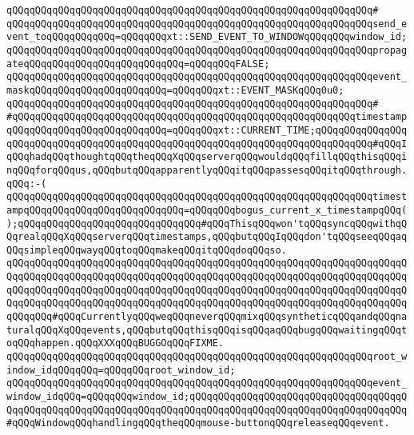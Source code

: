 \verb|qQQqqQQqqQQqqQQqqQQqqQQqqQQqqQQqqQQqqQQqqQQqqQQqqQQqqQQqqQQqqQQq#|\newline
\verb|qQQqqQQqqQQqqQQqqQQqqQQqqQQqqQQqqQQqqQQqqQQqqQQqqQQqqQQqqQQqqQQqsend_event_toqQQqqQQqqQQq=qQQqqQQqxt::SEND_EVENT_TO_WINDOWqQQqqQQqwindow_id;|\newline
\verb|qQQqqQQqqQQqqQQqqQQqqQQqqQQqqQQqqQQqqQQqqQQqqQQqqQQqqQQqqQQqqQQqpropagateqQQqqQQqqQQqqQQqqQQqqQQqqQQq=qQQqqQQqFALSE;|\newline
\verb|qQQqqQQqqQQqqQQqqQQqqQQqqQQqqQQqqQQqqQQqqQQqqQQqqQQqqQQqqQQqqQQqevent_maskqQQqqQQqqQQqqQQqqQQqqQQq=qQQqqQQqxt::EVENT_MASKqQQq0u0;|\newline
\verb|qQQqqQQqqQQqqQQqqQQqqQQqqQQqqQQqqQQqqQQqqQQqqQQqqQQqqQQqqQQqqQQq#|\newline
\verb|#qQQqqQQqqQQqqQQqqQQqqQQqqQQqqQQqqQQqqQQqqQQqqQQqqQQqqQQqqQQqtimestampqQQqqQQqqQQqqQQqqQQqqQQqqQQq=qQQqqQQqxt::CURRENT_TIME;qQQqqQQqqQQqqQQqqQQqqQQqqQQqqQQqqQQqqQQqqQQqqQQqqQQqqQQqqQQqqQQqqQQqqQQqqQQqqQQq#qQQqIqQQqhadqQQqthoughtqQQqtheqQQqXqQQqserverqQQqwouldqQQqfillqQQqthisqQQqinqQQqforqQQqus,qQQqbutqQQqapparentlyqQQqitqQQqpassesqQQqitqQQqthrough.qQQq:-(|\newline
\verb|qQQqqQQqqQQqqQQqqQQqqQQqqQQqqQQqqQQqqQQqqQQqqQQqqQQqqQQqqQQqqQQqtimestampqQQqqQQqqQQqqQQqqQQqqQQqqQQq=qQQqqQQqbogus_current_x_timestampqQQq();qQQqqQQqqQQqqQQqqQQqqQQqqQQqqQQq#qQQqThisqQQqwon'tqQQqsyncqQQqwithqQQqrealqQQqXqQQqserverqQQqtimestamps,qQQqbutqQQqIqQQqdon'tqQQqseeqQQqaqQQqsimpleqQQqwayqQQqtoqQQqmakeqQQqitqQQqdoqQQqso.|\newline
\verb|qQQqqQQqqQQqqQQqqQQqqQQqqQQqqQQqqQQqqQQqqQQqqQQqqQQqqQQqqQQqqQQqqQQqqQQqqQQqqQQqqQQqqQQqqQQqqQQqqQQqqQQqqQQqqQQqqQQqqQQqqQQqqQQqqQQqqQQqqQQqqQQqqQQqqQQqqQQqqQQqqQQqqQQqqQQqqQQqqQQqqQQqqQQqqQQqqQQqqQQqqQQqqQQqqQQqqQQqqQQqqQQqqQQqqQQqqQQqqQQqqQQqqQQqqQQqqQQqqQQqqQQqqQQqqQQqqQQqqQQqqQQqqQQq#qQQqCurrentlyqQQqweqQQqneverqQQqmixqQQqsyntheticqQQqandqQQqnaturalqQQqXqQQqevents,qQQqbutqQQqthisqQQqisqQQqaqQQqbugqQQqwaitingqQQqtoqQQqhappen.qQQqXXXqQQqBUGGOqQQqFIXME.|\newline
\verb|qQQqqQQqqQQqqQQqqQQqqQQqqQQqqQQqqQQqqQQqqQQqqQQqqQQqqQQqqQQqqQQqroot_window_idqQQqqQQq=qQQqqQQqroot_window_id;|\newline
\verb|qQQqqQQqqQQqqQQqqQQqqQQqqQQqqQQqqQQqqQQqqQQqqQQqqQQqqQQqqQQqqQQqevent_window_idqQQq=qQQqqQQqwindow_id;qQQqqQQqqQQqqQQqqQQqqQQqqQQqqQQqqQQqqQQqqQQqqQQqqQQqqQQqqQQqqQQqqQQqqQQqqQQqqQQqqQQqqQQqqQQqqQQqqQQqqQQqqQQq#qQQqWindowqQQqhandlingqQQqtheqQQqmouse-buttonqQQqreleaseqQQqevent.|\newline
